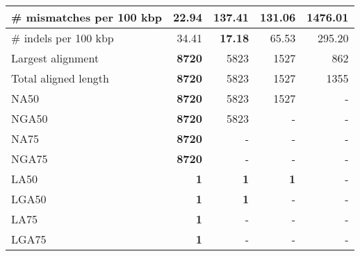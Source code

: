 \documentclass[12pt,a4paper]{article}
\begin{document}
\begin{table}[ht]
\begin{center}
\begin{tabular}{|l*{4}{|r}|}
\# mismatches per 100 kbp & {\bf 22.94} & 137.41 & 131.06 & 1476.01 \\ \hline
\# indels per 100 kbp & 34.41 & {\bf 17.18} & 65.53 & 295.20 \\ \hline
Largest alignment & {\bf 8720} & 5823 & 1527 & 862 \\ \hline
Total aligned length & {\bf 8720} & 5823 & 1527 & 1355 \\ \hline
NA50 & {\bf 8720} & 5823 & 1527 & - \\ \hline
NGA50 & {\bf 8720} & 5823 & - & - \\ \hline
NA75 & {\bf 8720} & - & - & - \\ \hline
NGA75 & {\bf 8720} & - & - & - \\ \hline
LA50 & {\bf 1} & {\bf 1} & {\bf 1} & - \\ \hline
LGA50 & {\bf 1} & {\bf 1} & - & - \\ \hline
LA75 & {\bf 1} & - & - & - \\ \hline
LGA75 & {\bf 1} & - & - & - \\ \hline
\end{tabular}
\end{center}
\end{table}
\end{document}

